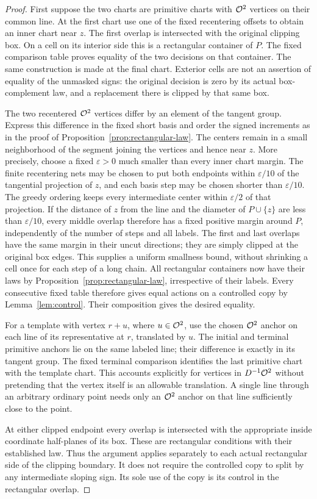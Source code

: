 \begin{proof}
First suppose the two charts are primitive charts with $\mathcal O^2$
vertices on their common line.  At the first chart use one of the
fixed recentering offsets to obtain an inner chart near $z$.
The first overlap is intersected with the original clipping box.
On a cell on its interior side this is a rectangular container of
$P$.  The fixed comparison table proves equality of the two
decisions on that container.  The same construction is made at
the final chart.  Exterior cells are not an assertion of equality
of the unmasked signs: the original decision is zero by its
actual box-complement law, and a replacement there is clipped
by that same box.

The two recentered $\mathcal O^2$ vertices differ by an element of the
tangent group.  Express this difference in the fixed short basis
and order the signed increments as in the proof of
Proposition~\ref{prop:rectangular-law}.  The centers remain in a
small neighborhood of the segment joining the vertices and hence
near $z$.  More precisely, choose a fixed $\varepsilon>0$ much
smaller than every inner chart margin.  The finite recentering
nets may be chosen to put both endpoints within $\varepsilon/10$
of the tangential projection of $z$, and each basis step may be
chosen shorter than $\varepsilon/10$.  The greedy ordering keeps
every intermediate center within $\varepsilon/2$ of that projection.
If the distance of $z$ from the line and the diameter of $P\cup\{z\}$ are
less than $\varepsilon/10$, every middle overlap therefore has a
fixed positive margin around $P$, independently of the number of
steps and all labels.  The first and last overlaps have the same
margin in their uncut directions; they are simply clipped at the
original box edges.  This supplies a uniform smallness bound,
without shrinking a cell once for each step of a long chain.
All rectangular containers now have their laws by
Proposition~\ref{prop:rectangular-law}, irrespective of their
labels.  Every consecutive fixed table therefore gives equal
actions on a controlled copy by Lemma~\ref{lem:control}.
Their composition gives the desired equality.

For a template with vertex $r+u$, where $u\in\mathcal O^2$, use the
chosen $\mathcal O^2$ anchor on each line of its representative at $r$,
translated by $u$.  The initial and terminal primitive anchors
lie on the same labeled line; their difference is exactly in its
tangent group.  The fixed terminal comparison identifies the
last primitive chart with the template chart.  This accounts
explicitly for vertices in $D^{-1}\mathcal O^2$ without pretending that
the vertex itself is an allowable translation.  A single line
through an arbitrary ordinary point needs only an $\mathcal O^2$
anchor on that line sufficiently close to the point.

At either clipped endpoint every overlap is intersected with
the appropriate inside coordinate half-planes of its box.
These are rectangular conditions with their established law.
Thus the argument applies separately to each actual rectangular
side of the clipping boundary.  It does not require the controlled
copy to split by any intermediate sloping sign.  Its sole use of
the copy is its control in the rectangular overlap.
\end{proof}


